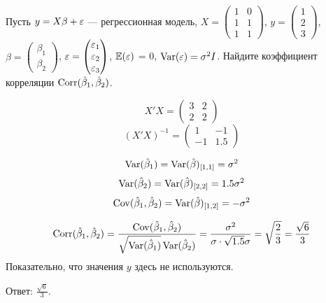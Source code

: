 \begin{problem}
 Пусть $y = X\beta + \varepsilon$ --- регрессионная модель, $X = \begin{pmatrix} 1 & 0 \\ 1 & 1 \\ 1 & 1 \end{pmatrix}$, $y = \begin{pmatrix} 1 \\ 2 \\ 3 \end{pmatrix}$, $\beta = \begin{pmatrix} \beta_1 \\ \beta_2 \end{pmatrix}$, $\varepsilon = \begin{pmatrix} \varepsilon_1 \\ \varepsilon_2 \\ \varepsilon_3 \end{pmatrix}$, $\mathbb{E}(\varepsilon)$ = 0, $\operatorname{Var}(\varepsilon) = \sigma^2 I$. Найдите коэффициент корреляции $\operatorname{Corr}(\hat{\beta}_1,\hat{\beta}_2)$.

\end{problem}

\begin{solution}
\[X'X=\left(\begin{array}{cc}
3 & 2 \\ 
2 & 2
\end{array}\right) \]
\[(X'X)^{-1}=\left(\begin{array}{cc}
1 & -1 \\ 
-1 & 1.5
\end{array}\right) \]

\[\operatorname{Var}(\hat\beta_1)=\operatorname{Var}(\hat\beta)_{[1,1]}=\sigma^2\]
\[\operatorname{Var}(\hat\beta_2)=\operatorname{Var}(\hat\beta)_{[2,2]}=1.5\sigma^2\]
\[\operatorname{Cov}(\hat\beta_1,\hat\beta_2)=\operatorname{Var}(\hat\beta)_{[1,2]}=-\sigma^2\]

\[\operatorname{Corr}(\hat\beta_1,\hat\beta_2)=\frac{\operatorname{Cov}(\hat\beta_1,\hat\beta_2)}{\sqrt{\operatorname{Var}(\hat\beta_1)}\operatorname{Var}(\hat\beta_2)}=\\
\\\frac{\sigma^2}{\sigma\cdot\sqrt{1.5}\sigma}=\sqrt{\frac{2}{3}}=\frac{\sqrt6}{3}\]
Показательно, что значения $y$ здесь не используются.

Ответ: $\frac{\sqrt6}{3}$.
\end{solution}


